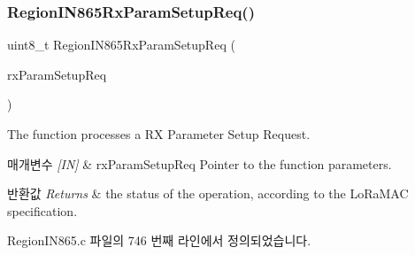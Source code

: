 \subsubsection{\texorpdfstring{Region\+I\+N865\+Rx\+Param\+Setup\+Req()}{RegionIN865RxParamSetupReq()}}
{\footnotesize\ttfamily uint8\+\_\+t Region\+I\+N865\+Rx\+Param\+Setup\+Req (\begin{DoxyParamCaption}\item[{\mbox{\hyperlink{group___r_e_g_i_o_n_ga7165f282c670c728c36d534df2285157}{Rx\+Param\+Setup\+Req\+Params\+\_\+t}} $\ast$}]{rx\+Param\+Setup\+Req }\end{DoxyParamCaption})}



The function processes a RX Parameter Setup Request. 


\begin{DoxyParams}{매개변수}
{\em \mbox{[}\+I\+N\mbox{]}} & rx\+Param\+Setup\+Req Pointer to the function parameters.\\
\hline
\end{DoxyParams}

\begin{DoxyRetVals}{반환값}
{\em Returns} & the status of the operation, according to the Lo\+Ra\+M\+AC specification. \\
\hline
\end{DoxyRetVals}


Region\+I\+N865.\+c 파일의 746 번째 라인에서 정의되었습니다.


